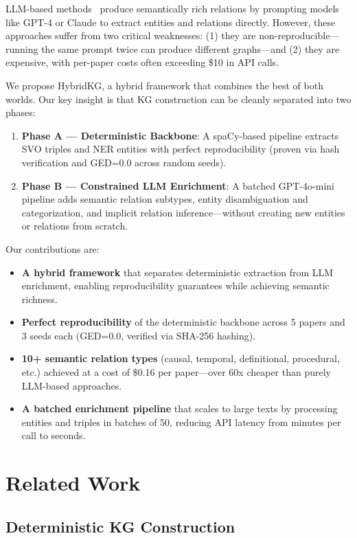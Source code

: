 \documentclass{article}
\newcommand{\method}{HybridKG\xspace}
\begin{document}
LLM-based methods~\cite{li2023, zhu2024} produce semantically rich relations by prompting models like GPT-4 or Claude to extract entities and relations directly. However, these approaches suffer from two critical weaknesses: (1) they are non-reproducible---running the same prompt twice can produce different graphs---and (2) they are expensive, with per-paper costs often exceeding \$10 in API calls.

We propose \method, a hybrid framework that combines the best of both worlds. Our key insight is that KG construction can be cleanly separated into two phases:
\begin{enumerate}
    \item \textbf{Phase A --- Deterministic Backbone}: A spaCy-based pipeline extracts SVO triples and NER entities with perfect reproducibility (proven via hash verification and GED=0.0 across random seeds).
    \item \textbf{Phase B --- Constrained LLM Enrichment}: A batched GPT-4o-mini pipeline adds semantic relation subtypes, entity disambiguation and categorization, and implicit relation inference---without creating new entities or relations from scratch.
\end{enumerate}

Our contributions are:
\begin{itemize}
    \item \textbf{A hybrid framework} that separates deterministic extraction from LLM enrichment, enabling reproducibility guarantees while achieving semantic richness.
    \item \textbf{Perfect reproducibility} of the deterministic backbone across 5 papers and 3 seeds each (GED=0.0, verified via SHA-256 hashing).
    \item \textbf{10+ semantic relation types} (causal, temporal, definitional, procedural, etc.) achieved at a cost of \$0.16 per paper---over 60x cheaper than purely LLM-based approaches.
    \item \textbf{A batched enrichment pipeline} that scales to large texts by processing entities and triples in batches of 50, reducing API latency from minutes per call to seconds.
\end{itemize}

\section{Related Work}

\subsection{Deterministic KG Construction}
\end{document}
